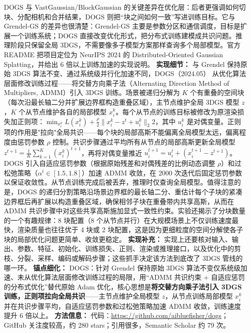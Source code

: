 DOGS 与 VastGaussian/BlockGaussian 的关键差异在优化层：后者更强调如何切块、分配相机和合并结果，DOGS 则把“块之间如何一致”写进训练目标。它与 Grendel-GS 的差异也很清楚：Grendel-GS 主要是参数分区和通信调度，目标是扩展一个训练系统；DOGS 直接改变优化形式，把分布式训练建模成共识问题。推理阶段只保留全局 3DGS，不需要像多子模型方案那样查询多个局部模型。官方 README 把项目定位为 NeurIPS 2024 的 Distributed-Oriented Gaussian Splatting，并给出 6 倍以上训练加速的实现说明。
\textbf{实现细节：} 与 Grendel 保持原始 3DGS 算法不变、通过系统级并行化加速不同，DOGS（2024.05） 从优化算法层面修改训练过程——将交替方向乘子法（Alternating Direction Method of Multipliers, ADMM）引入 3DGS 训练。场景被递归分解为 $K$ 个有重叠的空间块（每次沿最长轴二分并扩展边界框构造重叠区域），主节点维护全局 3DGS 模型 $z$，$K$ 个从节点维护各自的局部模型 $x_i^k$。每个从节点的训练目标被修改为原渲染损失加正则项：$\min_{x_i^k} L(x_i^k) + \frac{\rho}{2}\|x_i^k - z^t + u_i^k\|_2^{}2$，其中 $u_i^k$ 是对偶变量。正则项的作用是"拉向"全局共识——每个块的局部高斯不能偏离全局模型太远，偏离程度由惩罚参数 $\rho$ 控制。共识步骤通过平均所有从节点的局部高斯更新全局模型 $z^{t+1} = \frac{1}{K}\sum_{k=1}^{K}(x_i^k)^{t+1}$，再将对偶变量推近 $u_i^{t+1} = u_i^t + (x_i^{t+1} - z^{t+1})$。DOGS 引入自适应惩罚参数（根据原始残差和对偶残差的比例动态调整 $\rho$）和过松弛策略（$\alpha^t \in [1.5, 1.8]$）加速 ADMM 收敛，在 2000 次迭代后固定惩罚参数以保证收敛性。从节点训练完成后被丢弃，推理时仅查询全局模型。值得注意的是，DOGS 的递归分割策略沿场景边界框的最长轴二分、重估计每个子块的紧凑边界框后再扩展以构造重叠区域，确保相邻子块在重叠带内共享高斯，从而在 ADMM 共识步骤中对这些共享高斯施加显式一致性约束。实验还揭示了分块数量的一个有趣规律：8 块配置（8 个从节点并行）在大规模场景上不仅训练速度最快，渲染质量也往往优于 4 块或 2 块配置，这是因为更细粒度的空间分解使各子块的局部优化问题更简单、收敛更稳定。
\textbf{实现补充：} 实现上还要核对输入、输出、参数、特征、初始化、训练损失、正则、渲染或推理接口，以及优化中的剪枝、分裂、采样、编码或解码步骤；这些抓手决定该方法到底改了 3DGS 管线的哪一环。
\textbf{锚点细化：} DOGS：针对 Grendel 保持原始 3DGS 算法不变仅系统级加速、未从优化算法层面修改训练过程的局限，用``ADMM 共识约束 + 自适应惩罚的分布式优化''替代原始 Adam 优化，核心思想是\textbf{将交替方向乘子法引入 3DGS 训练，正则项拉向全局共识}——主节点维护全局模型 $z$，从节点训练局部模型 $x_i^k$ 并在共识步骤平均，自适应惩罚参数和过松弛策略加速 ADMM 收敛，训练速度提升 6 倍以上。
\textbf{方法信息：} 代码：\url{https://github.com/aibluefisher/dogs}；GitHub 关注度较高，约 280 stars；引用很多，Semantic Scholar 约 79 次。



